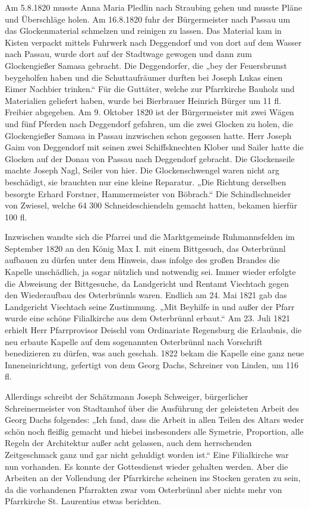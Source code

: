 \documentclass[12pt,a4paper]{book}
\begin{document}
Am 5.8.1820 musste Anna Maria Pledlin nach Straubing gehen und musste
Pläne und Überschläge holen. Am 16.8.1820 fuhr der Bürgermeister nach
Passau um das Glockenmaterial schmelzen und reinigen zu lassen. Das
Material kam in Kisten verpackt mittels Fuhrwerk nach Deggendorf und von
dort auf dem Wasser nach Passau, wurde dort auf der Stadtwage gewogen
und dann zum Glockengießer Samasa gebracht. Die Deggendorfer, die „bey
der Feuersbrunst beygeholfen haben und die Schuttaufräumer durften bei
Joseph Lukas einen Eimer Nachbier trinken.“ Für die Guttäter, welche zur
Pfarrkirche Bauholz und Materialien geliefert haben, wurde bei
Bierbrauer Heinrich Bürger um 11 fl. Freibier abgegeben. Am 9. Oktober
1820 ist der Bürgermeister mit zwei Wägen und fünf Pferden nach
Deggendorf gefahren, um die zwei Glocken zu holen, die Glockengießer
Samasa in Passau inzwischen schon gegossen hatte. Herr Joseph Gaim von
Deggendorf mit seinen zwei Schiffsknechten Klober und Sailer hatte die
Glocken auf der Donau von Passau nach Deggendorf gebracht. Die
Glockenseile machte Joseph Nagl, Seiler von hier. Die Glockenschwengel
waren nicht arg beschädigt, sie brauchten nur eine kleine Reparatur.
„Die Richtung derselben besorgte Erhard Forstner, Hammermeister von
Böbrach.“ Die Schindlschneider von Zwiesel, welche 64 300
Schneideschiendeln gemacht hatten, bekamen hierfür 100 fl.

Inzwischen wandte sich die Pfarrei und die Marktgemeinde Ruhmannsfelden
im September 1820 an den König Max I. mit einem Bittgesuch, das
Osterbrünnl aufbauen zu dürfen unter dem Hinweis, dass infolge des
großen Brandes die Kapelle unschädlich, ja sogar nützlich und notwendig
sei. Immer wieder erfolgte die Abweisung der Bittgesuche, da Landgericht
und Rentamt Viechtach gegen den Wiederaufbau des Osterbrünnls waren.
Endlich am 24. Mai 1821 gab das Landgericht Viechtach seine Zustimmung.
„Mit Beyhilfe in und außer der Pfarr wurde eine schöne Filialkirche aus
dem Osterbrünnl erbaut.“ Am 23. Juli 1821 erhielt Herr Pfarrprovisor
Deischl vom Ordinariate Regensburg die Erlaubnis, die neu erbaute
Kapelle auf dem sogenannten Osterbrünnl nach Vorschrift benedizieren zu
dürfen, was auch geschah. 1822 bekam die Kapelle eine ganz neue
Inneneinrichtung, gefertigt von dem Georg Dachs, Schreiner von Linden,
um 116 fl.

Allerdings schreibt der Schätzmann Joseph Schweiger, bürgerlicher
Schreinermeister von Stadtamhof über die Ausführung der geleisteten
Arbeit des Georg Dachs folgendes: „Ich fand, dass die Arbeit in allen
Teilen des Altars weder schön noch fleißig gemacht und hiebei
insbesonders alle Symetrie, Proportion, alle Regeln der Architektur
außer acht gelassen, auch dem herrschenden Zeitgeschmack ganz und gar
nicht gehuldigt worden ist.“ Eine Filialkirche war nun vorhanden. Es
konnte der Gottesdienst wieder gehalten werden. Aber die Arbeiten an der
Vollendung der Pfarrkirche scheinen ins Stocken geraten zu sein, da die
vorhandenen Pfarrakten zwar vom Osterbrünnl aber nichts mehr von
Pfarrkirche St. Laurentius etwas berichten.
\end{document}
